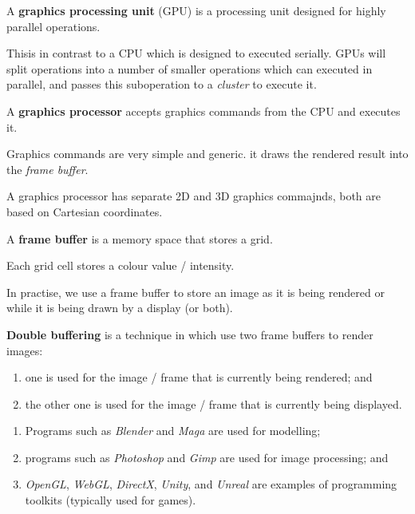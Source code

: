 
\begin{definition}[GPU]
    A \textbf{graphics processing unit} (GPU) is a processing unit designed
    for highly parallel operations.
\end{definition}

Thisis in contrast to a CPU which is designed to executed serially.
GPUs will split operations into a number of smaller operations which can
executed in parallel, and passes this suboperation to a \emph{cluster}
to execute it.

\begin{definition}
    A \textbf{graphics processor} accepts graphics commands from the CPU
    and executes it.
\end{definition}

Graphics commands are very simple and generic.
it draws the rendered result into the \emph{frame buffer}.

A graphics processor has separate 2D and 3D graphics commajnds, both
are based on Cartesian coordinates.

\begin{definition}
    A \textbf{frame buffer} is a memory space that stores a grid.
\end{definition}

Each grid cell stores a colour value / intensity.

In practise, we use a frame buffer to store an image as it is being rendered
or while it is being drawn by a display (or both).

\begin{definition}
    \textbf{Double buffering} is a technique in which use two frame buffers
    to render images:
    \begin{enumerate}
        \item one is used for the image / frame that is currently being
        rendered; and
        \item the other one is used for the image / frame that is currently
        being displayed.
    \end{enumerate}
\end{definition}

\begin{example}
    \hfill
    \begin{enumerate}
        \item Programs such as \emph{Blender} and \emph{Maga} are
        used for modelling;
        \item programs such as \emph{Photoshop} and \emph{Gimp} are
        used for image processing; and
        \item \emph{OpenGL}, \emph{WebGL}, \emph{DirectX}, \emph{Unity}, and
        \emph{Unreal} are examples of programming toolkits
        (typically used for games).
    \end{enumerate}
\end{example}


